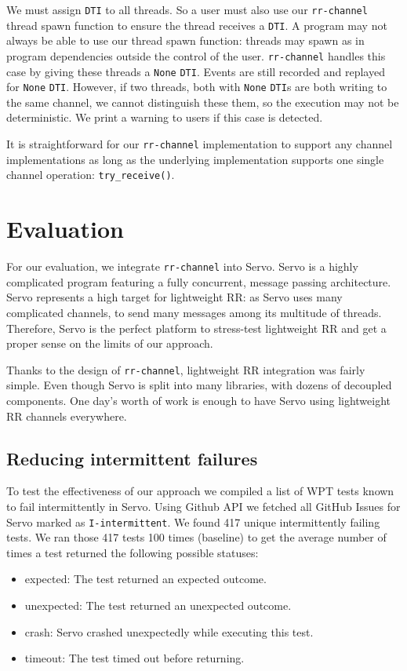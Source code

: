 \documentclass{article}
\begin{document}
We must assign \texttt{DTI} to all threads. So a user must also use our
\texttt{rr-channel} thread spawn function to ensure the thread receives a \texttt{DTI}. A
program may not always be able to use our thread spawn function: threads may spawn as in
program dependencies outside the control of the user. \texttt{rr-channel} handles this
case by giving these threads
a \texttt{None} \texttt{DTI}. Events are still recorded and replayed for \texttt{None}
\texttt{DTI}. However, if two threads, both with \texttt{None} \texttt{DTI}s are both
writing to the same channel, we cannot distinguish these them, so the execution may not
be deterministic. We print a warning to users if this case is detected.

It is straightforward for our \texttt{rr-channel} implementation to support
any channel implementations as long as the underlying implementation supports
one single channel operation: \texttt{try\_receive()}.

\section{Evaluation}
For our evaluation, we integrate \texttt{rr-channel} into Servo. Servo is a
highly complicated program featuring a fully concurrent, message passing architecture.
Servo represents a high target for lightweight RR: as Servo uses many complicated channels, to send many messages among its multitude of threads.
Therefore, Servo is the perfect platform to stress-test lightweight RR and get
a proper sense on the limits of our approach.

Thanks to the design of \texttt{rr-channel}, lightweight RR integration was fairly simple.
Even though Servo is split into many libraries, with dozens of decoupled components. One
day's worth of work is enough to have Servo using lightweight RR channels everywhere.

\subsection{Reducing intermittent failures}

To test the effectiveness of our approach we compiled a list of WPT tests known to
fail intermittently in Servo. Using Github API we fetched all GitHub Issues for Servo
marked as \texttt{I-intermittent}. We found 417 unique intermittently failing tests.
We ran those 417 tests 100 times (baseline) to get the average number of times a
test returned the following possible statuses:
\begin{itemize}
  \item expected: The test returned an expected outcome.
  \item unexpected: The test returned an unexpected outcome.
  \item crash: Servo crashed unexpectedly while executing this test.
  \item timeout: The test timed out before returning.
\end{itemize}
\end{document}
